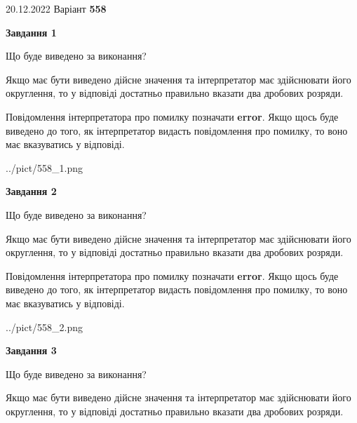 \documentclass[12pt, ukrainian]{article}
\begin{document}
{20.12.2022 Варіант \No \textbf { 558 }\par}
{
\begin {Large}

{\begin {center}\textbf{Завдання 1}\end {center}}\par
Що буде виведено за виконання? \par

Якщо має бути виведено дійсне значення та інтерпретатор має здійснювати його округлення, 
то у відповіді достатньо правильно вказати два дробових розряди.

Повідомлення інтерпретатора про помилку позначати \textbf{error}.
Якщо щось буде виведено до того, як інтерпретатор видасть повідомлення про помилку, 
то воно має вказуватись у відповіді. \par

\begin{center}
	{../pict/558_1.png}
\end{center}
\newpage

{\begin {center}\textbf{Завдання 2}\end {center}}\par
Що буде виведено за виконання? \par

Якщо має бути виведено дійсне значення та інтерпретатор має здійснювати його округлення, 
то у відповіді достатньо правильно вказати два дробових розряди.

Повідомлення інтерпретатора про помилку позначати \textbf{error}.
Якщо щось буде виведено до того, як інтерпретатор видасть повідомлення про помилку, 
то воно має вказуватись у відповіді. \par

\begin{center}
	{../pict/558_2.png}
\end{center}
\newpage

{\begin {center}\textbf{Завдання 3}\end {center}}\par
Що буде виведено за виконання? \par

Якщо має бути виведено дійсне значення та інтерпретатор має здійснювати його округлення, 
то у відповіді достатньо правильно вказати два дробових розряди.


\end{Large}}
\end{document}
